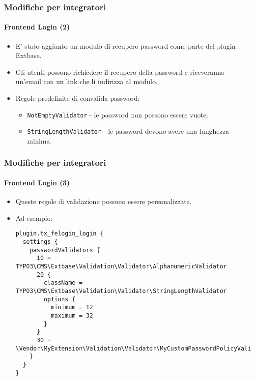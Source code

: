 
\begin{frame}[fragile]
	\frametitle{Modifiche per integratori}
	\framesubtitle{Frontend Login (2)}

	\begin{itemize}

		\item E' stato aggiunto un modulo di recupero password come parte del plugin Extbase.
		\item Gli utenti possono richiedere il recupero della password e riceveranno un'email con un link che li indirizza al modulo.
		\item Regole predefinite di convalida password:

			\begin{itemize}
				\item \texttt{NotEmptyValidator} - le password non possono essere vuote.
				\item \texttt{StringLengthValidator} - le password devono avere una lunghezza minima.
			\end{itemize}

	\end{itemize}

\end{frame}


\begin{frame}[fragile]
	\frametitle{Modifiche per integratori}
	\framesubtitle{Frontend Login (3)}

	\lstset{basicstyle=\tiny\ttfamily}

	\begin{itemize}
		\item Queste regole di validazione possono essere personalizzate.
		\item Ad esempio:
\begin{lstlisting}
plugin.tx_felogin_login {
  settings {
    passwordValidators {
      10 = TYPO3\CMS\Extbase\Validation\Validator\AlphanumericValidator
      20 {
        className = TYPO3\CMS\Extbase\Validation\Validator\StringLengthValidator
        options {
          minimum = 12
          maximum = 32
        }
      }
      30 = \Vendor\MyExtension\Validation\Validator\MyCustomPasswordPolicyValidator
    }
  }
}
\end{lstlisting}

	\end{itemize}

\end{frame}

